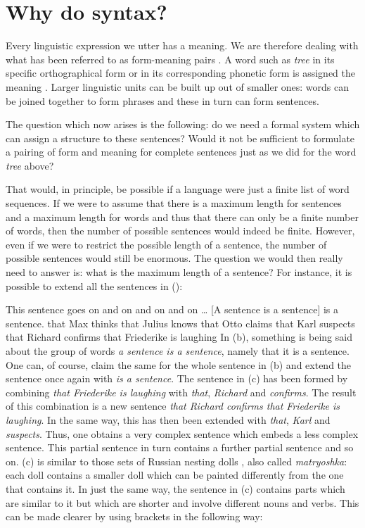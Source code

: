 \section{Why do syntax?}
\label{sec-wozu-syntax}

Every linguistic expression we utter has a meaning. We are therefore dealing with
what has been referred to as form-meaning pairs \citep{Saussure16a}\nocite{Saussure16a-Fr}. A word such as \emph{tree}
in its specific orthographical form or in its corresponding phonetic form is assigned the
meaning . Larger linguistic units can be built up out of smaller ones: words can be
joined together to form phrases and these in turn can form sentences. 

The question which now arises is the following: do we need a formal system which can assign a
structure to these sentences? Would it not be sufficient to formulate a pairing of form and meaning for complete sentences
just as we did for the word \emph{tree} above?  

That would, in principle, be possible if a language were just a finite list of word sequences.  If
we were to assume that there is a maximum length for sentences and a maximum length for words and
thus that there can only be a finite number of words, then the number of possible sentences would
indeed be finite.  However, even if we were to restrict the possible length of a sentence, the
number of possible sentences would still be enormous.  The question we would then really need
to answer is: what is the maximum length of a sentence?  For instance, it is possible to extend all
the sentences in (): 

\eal 
\ex This sentence goes on and on and on and on \ldots 
\ex {}[A sentence is a sentence] is a sentence.
\ex\label{einbettung-dass-Saetze}
that Max thinks that Julius knows that Otto claims that Karl suspects that Richard confirms that Friederike is laughing
\zl
In (b), something is being said about the group of words \emph{a sentence is a sentence},
namely that it is a sentence. One can, of course, claim the same for the whole sentence in
(b) and extend the sentence once again with \emph{is a sentence}. The sentence in (c)
has been formed by combining \emph{that Friederike is laughing} with \emph{that}, \emph{Richard} and \emph{confirms}. The result
of this combination is a new sentence \emph{that Richard confirms that Friederike is laughing}. In
the same way, this has then been extended with \emph{that}, \emph{Karl} and \emph{suspects}. 
Thus, one obtains a very complex sentence which embeds a less complex sentence. 
This partial sentence in turn contains a further partial sentence and so on.
(c) is similar to those sets of Russian nesting dolls%
, also called \emph{matryoshka}: each doll contains
a smaller doll which can be painted differently from the one that contains it. In just the same way,
the sentence in (c) contains parts which are similar to it but which are shorter and involve different nouns and verbs. This can be made clearer by using brackets in the following way: 

